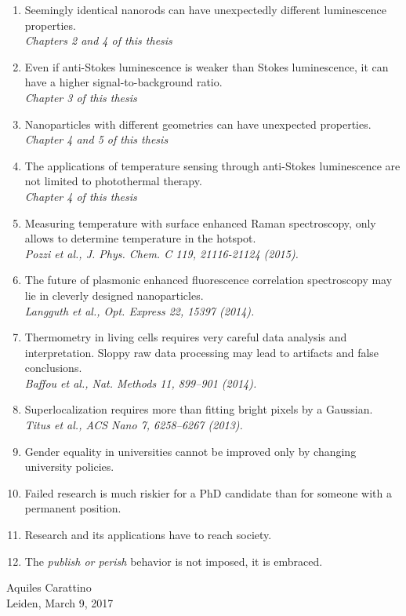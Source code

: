 \documentclass{dissertation}
\begin{document}
\begin{enumerate}

\item Seemingly identical nanorods can have unexpectedly different luminescence
properties.
\\
\textit{Chapters 2 and 4 of this thesis} 

\item Even if anti-Stokes luminescence is weaker than Stokes
luminescence, it can have a higher signal-to-background ratio.
\\
\textit{Chapter 3 of this thesis} 

\item Nanoparticles with different geometries can have unexpected properties.
\\
\textit{Chapter 4 and 5 of this thesis}

\item The applications of temperature sensing through anti-Stokes luminescence
are not limited to photothermal therapy.
\\
\textit{Chapter 4 of this thesis}

\item Measuring temperature with surface enhanced Raman spectroscopy, only
allows to determine temperature in the hotspot. \\
\textit{Pozzi et al., J. Phys. Chem. C 119, 21116-21124 (2015).}

\item The future of plasmonic enhanced fluorescence correlation spectroscopy may
lie in cleverly designed nanoparticles. \\
\textit{Langguth et al., Opt. Express 22, 15397 (2014).}

\item Thermometry in living cells requires very careful data analysis and
interpretation. Sloppy raw data processing may lead to artifacts and false
conclusions.
\\
\textit{Baffou et al., Nat. Methods 11, 899–901 (2014).}

\item Superlocalization requires more than fitting bright pixels by a
Gaussian.\\
\textit{Titus et al., ACS Nano 7, 6258–6267 (2013).}

\item Gender equality in universities cannot be improved only by changing
university policies. 

\item Failed research is much riskier for a PhD candidate than for someone with
a permanent position.

\item Research and its applications have to reach society.

\item The \textit{publish or perish} behavior is not imposed, it is embraced.

\end{enumerate}

\bigskip

\begin{center}
Aquiles Carattino \\
Leiden, March 9, 2017
\end{center}
\end{document}
